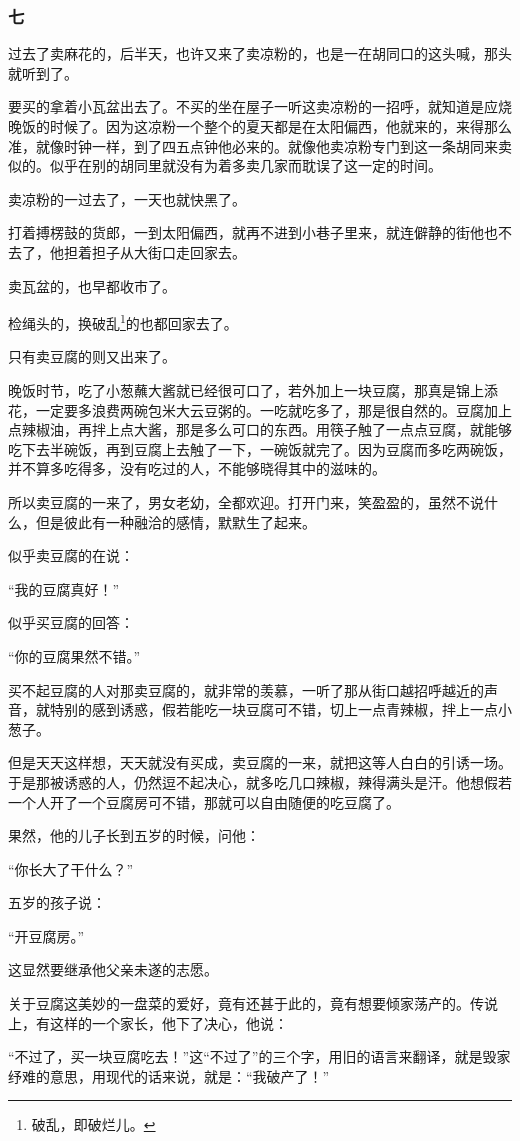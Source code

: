 \subsubsection*{七}
\par 过去了卖麻花的，后半天，也许又来了卖凉粉的，也是一在胡同口的这头喊，那头就听到了。
\par 要买的拿着小瓦盆出去了。不买的坐在屋子一听这卖凉粉的一招呼，就知道是应烧晚饭的时候了。因为这凉粉一个整个的夏天都是在太阳偏西，他就来的，来得那么准，就像时钟一样，到了四五点钟他必来的。就像他卖凉粉专门到这一条胡同来卖似的。似乎在别的胡同里就没有为着多卖几家而耽误了这一定的时间。
\par 卖凉粉的一过去了，一天也就快黑了。
\par 打着搏楞鼓的货郎，一到太阳偏西，就再不进到小巷子里来，就连僻静的街他也不去了，他担着担子从大街口走回家去。
\par 卖瓦盆的，也早都收市了。
\par 检绳头的，换破乱\footnote{破乱，即破烂儿。}的也都回家去了。
\par 只有卖豆腐的则又出来了。
\par 晚饭时节，吃了小葱蘸大酱就已经很可口了，若外加上一块豆腐，那真是锦上添花，一定要多浪费两碗包米大云豆粥的。一吃就吃多了，那是很自然的。豆腐加上点辣椒油，再拌上点大酱，那是多么可口的东西。用筷子触了一点点豆腐，就能够吃下去半碗饭，再到豆腐上去触了一下，一碗饭就完了。因为豆腐而多吃两碗饭，并不算多吃得多，没有吃过的人，不能够晓得其中的滋味的。
\par 所以卖豆腐的一来了，男女老幼，全都欢迎。打开门来，笑盈盈的，虽然不说什么，但是彼此有一种融洽的感情，默默生了起来。
\par 似乎卖豆腐的在说：
\par “我的豆腐真好！”
\par 似乎买豆腐的回答：
\par “你的豆腐果然不错。”
\par 买不起豆腐的人对那卖豆腐的，就非常的羡慕，一听了那从街口越招呼越近的声音，就特别的感到诱惑，假若能吃一块豆腐可不错，切上一点青辣椒，拌上一点小葱子。
\par 但是天天这样想，天天就没有买成，卖豆腐的一来，就把这等人白白的引诱一场。于是那被诱惑的人，仍然逗不起决心，就多吃几口辣椒，辣得满头是汗。他想假若一个人开了一个豆腐房可不错，那就可以自由随便的吃豆腐了。
\par 果然，他的儿子长到五岁的时候，问他：
\par “你长大了干什么？”
\par 五岁的孩子说：
\par “开豆腐房。”
\par 这显然要继承他父亲未遂的志愿。
\par 关于豆腐这美妙的一盘菜的爱好，竟有还甚于此的，竟有想要倾家荡产的。传说上，有这样的一个家长，他下了决心，他说：
\par “不过了，买一块豆腐吃去！”这“不过了”的三个字，用旧的语言来翻译，就是毁家纾难的意思，用现代的话来说，就是：“我破产了！”
